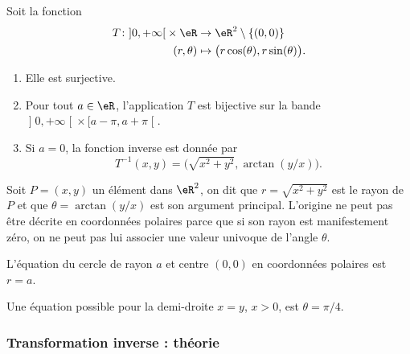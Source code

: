 \begin{proposition}     \label{PROPooFLUAooDsyMXO}
	Soit la fonction
	\begin{equation}
		\begin{aligned}
			T\colon \mathopen] 0 , +\infty \mathclose[\times \eR & \to \eR^2\setminus\{(0,0)\}                      \\
			(r,\theta)                                           & \mapsto \big( r\cos(\theta),r\sin(\theta) \big).
		\end{aligned}
	\end{equation}
	\begin{enumerate}
		\item
		      Elle est surjective.
		\item
		      Pour tout \( a\in \eR\), l'application \( T\) est bijective sur la bande \( \mathopen] 0 , +\infty \mathclose[\times \mathopen[ a-\pi , a+\pi \mathclose[\).
		\item
		      Si \( a=0\), la fonction inverse est donnée par
		      \begin{equation}
			      T^{-1}(x,y)=\big( \sqrt{ x^2+y^2 },\arctan(y/x) \big).
		      \end{equation}
	\end{enumerate}
\end{proposition}

Soit $P=(x,y)$ un élément dans $\eR^2$, on dit que $r=\sqrt{x^2+y^2}$ est le rayon de $P$ et que $\theta=\arctan (y/x) $ est son argument principal. L'origine ne peut pas être décrite en coordonnées polaires parce que si son rayon est manifestement zéro, on ne peut pas lui associer une valeur univoque de l'angle $\theta$.

\begin{example}
	L'équation du cercle de rayon $a$ et centre $(0, 0)$ en coordonnées polaires est $r=a$.
\end{example}

\begin{example}
	Une équation possible pour la demi-droite $x=y$, $x>0$,  est $\theta=\pi/4$.
\end{example}
\subsubsection{Transformation inverse : théorie}

